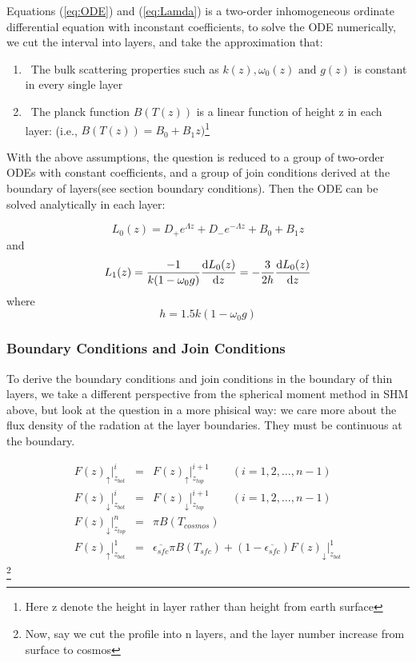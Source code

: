 \documentclass[a4paper]{report}
\begin{document}
Equations (\ref{eq:ODE}) and (\ref{eq:Lamda}) is a 
two-order inhomogeneous ordinate differential equation 
with inconstant coefficients, to solve the ODE numerically, 
we cut the interval into layers, and take the approximation that:
\begin{enumerate}
\item The bulk scattering properties such as $k(z), \omega_{0}(z) \textrm{ and } g(z)$
is constant in every single layer
\item The planck function $B(T(z))$ is a linear function of height z in each layer:
(i.e., $B(T(z)) = B_{0} + B_{1}z) $\footnote{Here z denote the height in layer rather than height from earth surface}
\end{enumerate}
With the above assumptions, the question is reduced to a group of 
two-order ODEs with constant coefficients, and a group of join conditions
derived at the boundary of layers(see section boundary conditions).
Then the ODE can be solved analytically in each layer:

\begin{equation} \label{eq:analsolul0}
    L_{0}(z) = D_{+}e^{\Lambda z} + D_{-}e^{ - \Lambda z} + B_{0} + B_{1}z
\end{equation}
and
\begin{equation} \label{eq:analsolul1}
    L_{1}(z) = \frac{-1}{k(1-\omega_{0}g)}\frac{\mathrm{d} L_{0}(z)}{\mathrm{d} z} 
    = -\frac{3}{2h} \frac{\mathrm{d} L_{0}(z)}{\mathrm{d} z}
\end{equation}
where
\begin{equation} \label{eq:h}
    h = 1.5k(1-\omega_{0}g)
\end{equation}

\subsubsection{Boundary Conditions and Join Conditions}
To derive the boundary conditions and join conditions in the boundary of 
thin layers, we take a different perspective from the spherical moment method in SHM above,
but look at the question in a more phisical way: we care more about the flux density of the radation 
at the layer boundaries. They must be continuous at the boundary.


\begin{eqnarray} \label{eq:fluxdensity} 
    F(z)_{\uparrow}\Big|_{z_{bot}}^{i} & = & F(z)_{\uparrow}\Big|_{z_{top}}^{i+1} \qquad (i=1,2,\ldots,n-1) \nonumber\\
    F(z)_{\downarrow}\Big|_{z_{bot}}^{i} & = & F(z)_{\downarrow}\Big|_{z_{top}}^{i+1} \qquad (i=1,2,\ldots,n-1) \nonumber\\
    F(z)_{\downarrow}\Big|_{z_{top}}^{n} & = & \pi B(T_{cosmos}) \nonumber\\
    F(z)_{\uparrow}\Big|_{z_{bot}}^{1} & = & \overline{\epsilon_{sfc}} \pi B(T_{sfc}) 
    + (1-\overline{\epsilon_{sfc}}) F(z)_{\downarrow}\Big|_{z_{bot}}^{1}  
\end{eqnarray} \footnote{Now, say we cut the profile into n layers, and the layer number increase from surface to cosmos}
\end{document}
